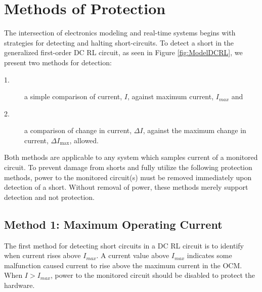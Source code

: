 \documentclass[11pt,oneside]{report}
\begin{document}
    \chapter{Methods of Protection}\label{chap:method of protection}
    The intersection of electronics modeling and real-time systems begins with strategies for detecting and halting short-circuits. To detect a short in the generalized first-order DC RL circuit, as seen in Figure \ref{fig:ModelDCRL}, we present two methods for detection:
    \begin{description}
    \item [1.] a simple comparison of current, $I$, against maximum current, $I_{max}$ and
    \item [2.] a comparison of change in current, $\Delta I$, against the maximum change in current, $\Delta I_{\max}$, allowed.
    \end{description}
    Both methods are applicable to any system which samples current of a monitored circuit. To prevent damage from shorts and fully utilize the following protection methods, power to the monitored circuit(s) must be removed immediately upon detection of a short. Without removal of power, these methods merely support detection and not protection.
    \section*{Method 1: Maximum Operating Current}
    The first method for detecting short circuits in a DC RL circuit is to identify when current rises above $I_{max}$. A current value above $I_{max}$ indicates some malfunction caused current to rise above the maximum current in the OCM. When $I > I_{max}$, power to the monitored circuit should be disabled to protect the hardware.
\end{document}
